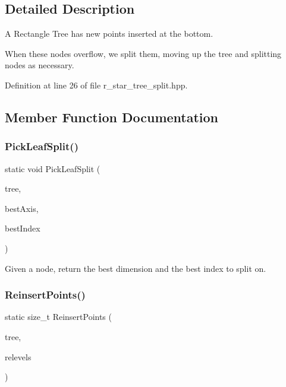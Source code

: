 \subsection{Detailed Description}
A Rectangle Tree has new points inserted at the bottom. 

When these nodes overflow, we split them, moving up the tree and splitting nodes as necessary. 

Definition at line 26 of file r\+\_\+star\+\_\+tree\+\_\+split.\+hpp.



\subsection{Member Function Documentation}
\mbox{\label{classmlpack_1_1tree_1_1RStarTreeSplit_aae7d976de7b1ce1a2dfe3ef1bbd6db42}} 
\subsubsection{Pick\+Leaf\+Split()}
{\footnotesize\ttfamily static void Pick\+Leaf\+Split (\begin{DoxyParamCaption}\item[{Tree\+Type $\ast$}]{tree,  }\item[{size\+\_\+t \&}]{best\+Axis,  }\item[{size\+\_\+t \&}]{best\+Index }\end{DoxyParamCaption})\hspace{0.3cm}{\ttfamily [static]}}



Given a node, return the best dimension and the best index to split on. 

\mbox{\label{classmlpack_1_1tree_1_1RStarTreeSplit_a1100e195f158ec58fb680edc0e57b5eb}} 
\subsubsection{Reinsert\+Points()}
{\footnotesize\ttfamily static size\+\_\+t Reinsert\+Points (\begin{DoxyParamCaption}\item[{Tree\+Type $\ast$}]{tree,  }\item[{std\+::vector$<$ bool $>$ \&}]{relevels }\end{DoxyParamCaption})\hspace{0.3cm}{\ttfamily [static]}}



